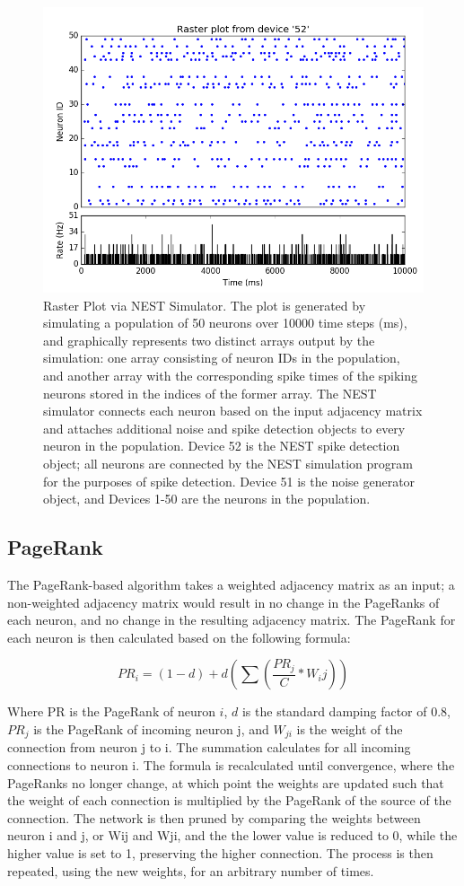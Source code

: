 \documentclass[11pt]{article}
\begin{document}
\begin{figure}[H]
\centering
	\includegraphics[scale=0.5]{./Figures/figure_1.png} 
	\caption{Raster Plot via NEST Simulator. The plot is generated by simulating a population of 50 neurons over 10000 time steps (ms), and graphically represents two distinct arrays output by the simulation: one array consisting of neuron IDs in the population, and another array with the corresponding spike times of the spiking neurons stored in the indices of the former array. The NEST simulator connects each neuron based on the input adjacency matrix and attaches additional noise and spike detection objects to every neuron in the population. Device 52 is the NEST spike detection object; all neurons are connected by the NEST simulation program for the purposes of spike detection. Device 51 is the noise generator object, and Devices 1-50 are the neurons in the population. }
\end{figure}

\subsection{PageRank}
The PageRank-based algorithm takes a weighted adjacency matrix as an input; a non-weighted adjacency matrix would result in no change in the PageRanks of each neuron, and no change in the resulting adjacency matrix. The PageRank for each neuron is then calculated based on the following formula:

$$PR_i = (1-d)+d(\sum(\frac{PR_j}{C} * W_ij))$$

Where PR is the PageRank of neuron $i$, $d$ is the standard damping factor of 0.8, $PR_j$ is the PageRank of incoming neuron j, and $W_{ji}$ is the weight of the connection from neuron j to i. The summation calculates for all incoming connections to neuron i. The formula is recalculated until convergence, where the PageRanks no longer change, at which point the weights are updated such that the weight of each connection is multiplied by the PageRank of the source of the connection. The network is then pruned by comparing the weights between neuron i and j, or Wij and Wji, and the the lower value is reduced to 0, while the higher value is set to 1, preserving the higher connection. The process is then repeated, using the new weights, for an arbitrary number of times.\par
\end{document}
